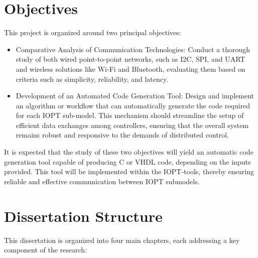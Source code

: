 \section{Objectives}
\label{sec:objectives}

This project is organized around two principal objectives:

\begin{itemize}
    \item Comparative Analysis of Communication Technologies: Conduct a thorough study of both wired point-to-point networks, such as I2C, SPI, and UART and wireless solutions like Wi-Fi and Bluetooth, evaluating them based on criteria such as simplicity, reliability, and latency.
    \item Development of an Automated Code Generation Tool: Design and implement an algorithm or workflow that can automatically generate the code required for each IOPT sub-model. This mechanism should streamline the setup of efficient data exchanges among controllers, ensuring that the overall system remains robust and responsive to the demands of distributed control.
\end{itemize}

It is expected that the study of these two objectives will yield an automatic code generation tool capable of producing C or VHDL code, depending on the inputs provided. This tool will be implemented within the IOPT-tools, thereby ensuring reliable and effective communication between IOPT submodels.





\section{Dissertation Structure}
\label{sec:dissertation_structure}


This dissertation is organized into four main chapters, each addressing a key component of the research:


